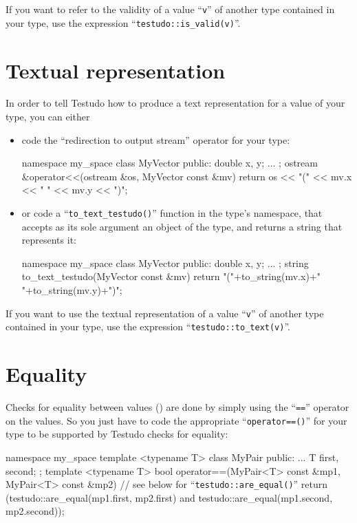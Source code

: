 \documentclass[twoside, a4paper, article]{memoir}
\begin{document}
If you want to refer to the validity of a value ``\texttt{v}'' of another type
contained in your type, use the expression ``\texttt{testudo::is\_valid(v)}''.

\section{Textual representation}
\label{sec:textual-representation}

In order to tell Testudo how to produce a text representation for a value of
your type, you can either
\begin{itemize}
\item code the ``redirection to output stream'' operator for your type:
\begin{cpplisting}
namespace my_space {
  class MyVector {
  public:
    double x, y;
    ...
  };
  ostream &operator<<(ostream &os, MyVector const &mv) {
    return os << "(" << mv.x << " " << mv.y << ")";
  }
}
\end{cpplisting}
\item or code a ``\texttt{to\_text\_testudo()}'' function in the type's
  namespace, that accepts as its sole argument an object of the type, and
  returns a string that represents it:
\begin{cpplisting}
namespace my_space {
  class MyVector {
  public:
    double x, y;
    ...
  };
  string to_text_testudo(MyVector const &mv) {
    return "("+to_string(mv.x)+" "+to_string(mv.y)+")";
  }
}
\end{cpplisting}
\end{itemize}

If you want to use the textual representation of a value ``\texttt{v}'' of
another type contained in your type, use the expression
``\texttt{testudo::to\_text(v)}''.

\section{Equality}
\label{sec:equality}

Checks for equality between values
() are done by simply using the
``\texttt{==}'' operator on the values.  So you just have to code the
appropriate ``\texttt{operator==()}'' for your type to be supported by Testudo
checks for equality:
\begin{cpplisting}
namespace my_space {
  template <typename T>
  class MyPair {
  public:
    ...
    T first, second;
  };
  template <typename T>
  bool operator==(MyPair<T> const &mp1,
                  MyPair<T> const &mp2) {
    // see below for ``\texttt{testudo::are\_equal()}''
    return (testudo::are_equal(mp1.first, mp2.first)
             and testudo::are_equal(mp1.second, mp2.second));
  }
}
\end{cpplisting}
\end{document}
